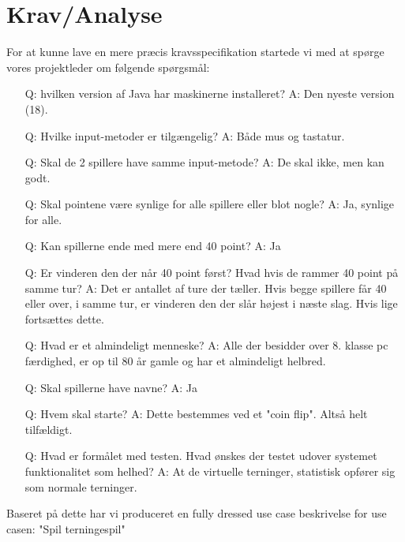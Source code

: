 \documentclass{article}
\begin{document}
 
\section{Krav/Analyse}
For at kunne lave en mere præcis kravsspecifikation startede vi med at spørge vores projektleder om følgende spørgsmål:
\begin{itemize}
    \item [Q:] hvilken version af Java har maskinerne installeret?
            \subitem A: Den nyeste version (18).
    \item [Q:]Hvilke input-metoder er tilgængelig?
            \subitem A: Både mus og tastatur.
    \item [Q:]Skal de 2 spillere have samme input-metode?
            \subitem A: De skal ikke, men kan godt.
    \item [Q:]Skal pointene være synlige for alle spillere eller blot nogle?
            \subitem A: Ja, synlige for alle.
    \item [Q:]Kan spillerne ende med mere end 40 point?
            \subitem A: Ja
    \item [Q:]Er vinderen den der når 40 point først? Hvad hvis de rammer 40 point på samme tur?
            \subitem A: Det er antallet af ture der tæller. Hvis begge spillere får 40 eller over, i samme tur, er vinderen den der slår højest i næste slag. Hvis lige fortsættes dette.
    \item [Q:]Hvad er et almindeligt menneske?
            \subitem A: Alle der besidder over 8. klasse pc færdighed, er op til 80 år gamle og har et almindeligt helbred.
    \item [Q:] Skal spillerne have navne?
            \subitem A: Ja
    \item [Q:]Hvem skal starte?
            \subitem A: Dette bestemmes ved et "coin flip". Altså helt tilfældigt.
    \item [Q:]Hvad er formålet med testen. Hvad ønskes der testet udover systemet funktionalitet som helhed?
        \subitem A: At de virtuelle terninger, statistisk opfører sig som normale terninger.
\end{itemize}

\noindent Baseret på dette har vi produceret en fully dressed use case beskrivelse for use casen: "Spil terningespil"
\end{document}
